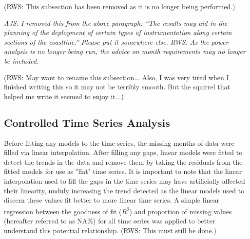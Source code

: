 \documentclass{ametsoc}
\begin{document}
(RWS: This subsection has been removed as it is no longer being performed.)

\emph{AJS: I removed this from the above paragraph: ``The results may aid in the planning of the deployment of certain types of instrumentation along certain sections of the coastline.'' Please put it somewhere else. RWS: As the power analysis is no longer being run, the advice on month requirements may no longer be included.}

(RWS: May want to rename this subsection... Also, I was very tired when I finished writing this so it may not be terribly smooth. But the squirrel that helped me write it seemed to enjoy it...)
\subsection{Controlled Time Series Analysis}
Before fitting any models to the time series, the missing months of data were filled via linear interpolation. After filling any gaps, linear models were fitted to detect the trends in the data and remove them by taking the residuals from the fitted models for use as "flat" time series. It is important to note that the linear interpolation used to fill the gaps in the time series may have artificially affected their linearity, unduly increasing the trend detected as the linear models used to discern these values fit better to more linear time series. A simple linear regression between the goodness of fit (\emph{R}\textsuperscript{2}) and proportion of missing values (hereafter referred to as NA\%) for all time series was applied to better understand this potential relationship. (RWS: This must still be done.)
\end{document}
